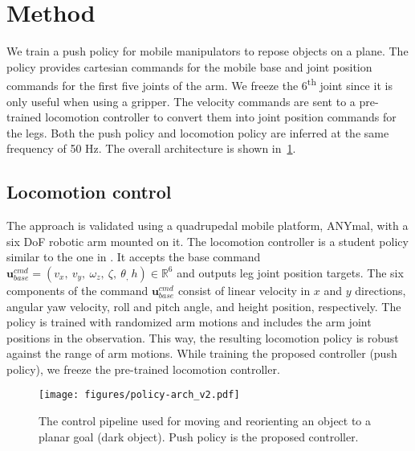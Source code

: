 \section{Method}
\label{sec:method}
We train a push policy for mobile manipulators to repose objects on a plane. The policy provides cartesian commands for the mobile base and joint position commands for the first five joints of the arm. We freeze the 6\textsuperscript{th} joint since it is only useful when using a gripper. The velocity commands are sent to a pre-trained locomotion controller to convert them into joint position commands for the legs. Both the push policy and locomotion policy are inferred at the same frequency of 50 Hz. The overall architecture is shown in~\cref{Fig:framework}.
\subsection{Locomotion control}
\label{subsec:robot_locomotion}
%
The approach is validated using a quadrupedal mobile platform, ANYmal, with a six DoF robotic arm mounted on it. The locomotion controller is a student policy similar to the one in \cite{miki2024learningwalkconfinedspaces}. It accepts the base command $\pmb u_{base}^{cmd} = (v_x, \ v_y, \ \omega_z, \ \zeta, \ \theta_, \ h) \in \mathbb{R}^6$ and outputs leg joint position targets. The six components of the command $\pmb u_{base}^{cmd}$ consist of linear velocity in $x$ and $y$ directions, angular yaw velocity, roll and pitch angle, and height position, respectively. The policy is trained with randomized arm motions and includes the arm joint positions in the observation. This way, the resulting locomotion policy is robust against the range of arm motions. While training the proposed controller (push policy), we freeze the pre-trained locomotion controller.

\begin{figure}
  \centering
  \graphicspath{{figures/}}
  \texttt{[image: figures/policy-arch\_v2.pdf]}
  \vspace{-20pt}
  \caption{The control pipeline used for moving and reorienting an object to a planar goal (dark object). Push policy is the proposed controller.}
  \label{Fig:framework}
\end{figure}


